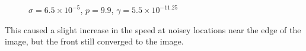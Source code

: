 \documentclass[margin=1in,12pt,3p]{elsarticle}
\begin{document}
\begin{figure}[h!]
  \centering
  \hfill
  \\
  \\
  \caption{$\sigma = 6.5\times 10^{-5}$, $p = 9.9$, $\gamma=5.5\times 10^{-11.25}$}
\end{figure}
This caused a slight increase in the speed at noisey locations near the edge of the image, but the front still converged to the image.
\clearpage
\end{document}
